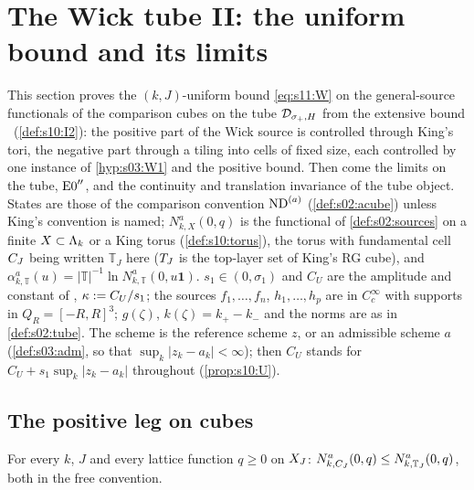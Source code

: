 \section{The Wick tube II: the uniform bound and its limits}

This section proves the $(k,J)$-uniform bound \eqref{eq:s11:W} on the general-source functionals of the comparison cubes on the tube $\mathcal D_{\sigma_+,H}$ from the extensive bound \Itwo\ (\cref{def:s10:I2}): the positive part of the Wick source is controlled through King's tori, the negative part through a tiling into cells of fixed size, each controlled by one instance of \cref{hyp:s03:W1} and the positive bound. Then come the limits on the tube, $\mathrm{E0}''$, and the continuity and translation invariance of the tube object. States are those of the comparison convention $\mathrm{ND}^{(a)}$ (\cref{def:s02:acube}) unless King's convention is named; $N^a_{k,X}(0,q)$ is the functional of \cref{def:s02:sources} on a finite $X\subset\Lambda_k$ or a King torus (\cref{def:s10:torus}), the torus with fundamental cell $C_J$ being written $\mathbb T_J$ here ($T_J$ is the top-layer set of King's RG cube), and $\alpha^a_{k,\mathbb T}(u)=|\mathbb T|^{-1}\ln N^a_{k,\mathbb T}(0,u\mathbf 1)$. $s_1\in(0,\sigma_1)$ and $C_U$ are the amplitude and constant of \Itwo, $\kappa:= C_U/s_1$; the sources $f_1,\dots,f_n$, $h_1,\dots,h_p$ are in $C^\infty_c$ with supports in $Q_R=[-R,R]^3$; $g(\zeta)$, $k(\zeta)=k_+-k_-$ and the norms are as in \cref{def:s02:tube}. The scheme is the reference scheme $z$, or an admissible scheme $a$ (\cref{def:s03:adm}, so that $\sup_k|z_k-a_k|<\infty$); then $C_U$ stands for $C_U+s_1\sup_k|z_k-a_k|$ throughout (\cref{prop:s10:U}).

\subsection{The positive leg on cubes}

\begin{proposition}\label{prop:s11:W2}
For every $k$, $J$ and every lattice function $q\ge0$ on $X_J$: $N^a_{k,C_J}(0,q)\le N^a_{k,\mathbb T_J}(0,q)$, both in the free convention.
\end{proposition}

